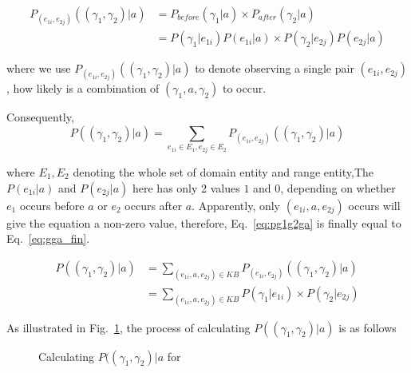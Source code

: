 \begin{equation} \begin{split} P_{(e_{1i},e_{2j})}((\gamma_{1},\gamma_{2}) |a)&=P_{before}(\gamma_1|a) \times P_{after}(\gamma_2|a) \\&=  P(\gamma_{1}|e_{1i}) P(e_{1i}|a) \times P(\gamma_{2}|e_{2j})P(e_{2j}|a) \end{split} \label{eq:giga}\end{equation}


where we use $P_{(e_{1i},e_{2j})}((\gamma_{1},\gamma_{2}) |a)$ to denote observing a single pair $(e_{1i},e_{2j})$, how likely is a combination of $(\gamma_{1},a,\gamma_{2})$ to occur.

Consequently,
\begin{equation} P((\gamma_{1},\gamma_{2}) |a)=\sum_{  e_{1i} \in E_1 ,e_{2j} \in E_2} P_{(e_{1i},e_{2j})}((\gamma_{1},\gamma_{2}) |a) \label{eq:pg1g2ga}\end{equation}

where $E_1,E_2$ denoting the whole set of domain entity and range entity,The  $P(e_{1i}|a)$ and $P(e_{2j}|a)$ here has only 2 values $1$ and  $0$, depending on whether  $e_1$ occurs before $a$ or $e_2$ occurs after $a$. Apparently, only $(e_{1i}, a, e_{2j})$ occurs will give the equation a non-zero value, therefore, Eq.~\ref{eq:pg1g2ga} is finally equal to Eq.~\ref{eq:gga_fin}.

\begin{equation} \begin{split} P((\gamma_{1},\gamma_{2}) |a) &= \sum_{  (e_{1i},a,e_{2j})\in KB } P_{(e_{1i},e_{2j})}((\gamma_{1},\gamma_{2}) |a) \\&=  \sum_{  (e_{1i},a,e_{2j})\in KB }P(\gamma_{1}|e_{1i}) \times P(\gamma_{2}|e_{2j})\end{split} \label{eq:gga_fin}\end{equation}


\begin{example}
\label{exa:pggga}
As illustrated in Fig.~\ref{fig:bipartite}, the process of calculating $P((\gamma_{1},\gamma_{2}) |a)$ is as follows\term{}
\end{example}


\begin{figure}[!htb]
\centering {}
\caption{Calculating $P((\gamma_{1},\gamma_{2}) |a$ for \term{}} \label{fig:bipartite}
\end{figure}

